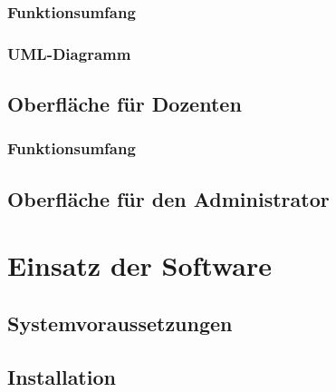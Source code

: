 \documentclass[12pt,a4paper,parskip]{scrreprt}
\begin{document}
\subsection{Funktionsumfang}
\subsection{UML-Diagramm}
\section{Oberfläche für Dozenten}
\subsection{Funktionsumfang}
\section{Oberfläche für den Administrator}
\chapter{Einsatz der Software}
\section{Systemvoraussetzungen}
\section{Installation}
\end{document}
